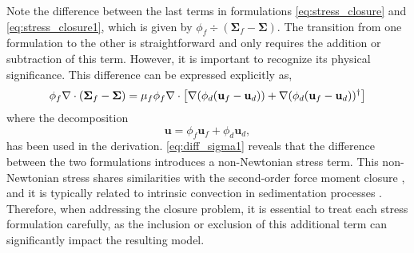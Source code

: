 Note the difference between the last terms in formulations \ref{eq:stress_closure} and \ref{eq:stress_closure1}, which is given by $\phi_f \div (\bm\Sigma_f -\bm\Sigma)$.
The transition from one formulation to the other is straightforward and only requires the addition or subtraction of this term. 
However, it is important to recognize its physical significance.
This difference can be expressed explicitly as,
\begin{equation}
    \phi_f \div(\bm\Sigma_f - \bm\Sigma) = \mu_f \phi_f \div \left[\grad (\phi_d (\textbf{u}_f - \textbf{u}_d)) + \grad (\phi_d (\textbf{u}_f - \textbf{u}_d))^\dagger \right]
    \label{eq:diff_sigma1}
\end{equation}
where the decomposition 
\begin{equation}
\textbf{u} = \phi_f \textbf{u}_f + \phi_d \textbf{u}_d,
\label{eq:u_mean} 
\end{equation}
has been used in the derivation.
\ref{eq:diff_sigma1} reveals that the difference between the two formulations introduces a non-Newtonian stress term.
This non-Newtonian stress shares similarities with the second-order force moment closure \citep{jackson1997locally,zhang1997momentum}, and it is typically related to intrinsic convection in sedimentation processes \citep{lhuillier2022}.
Therefore, when addressing the closure problem, it is essential to treat each stress formulation carefully, as the inclusion or exclusion of this additional term can significantly impact the resulting model.





